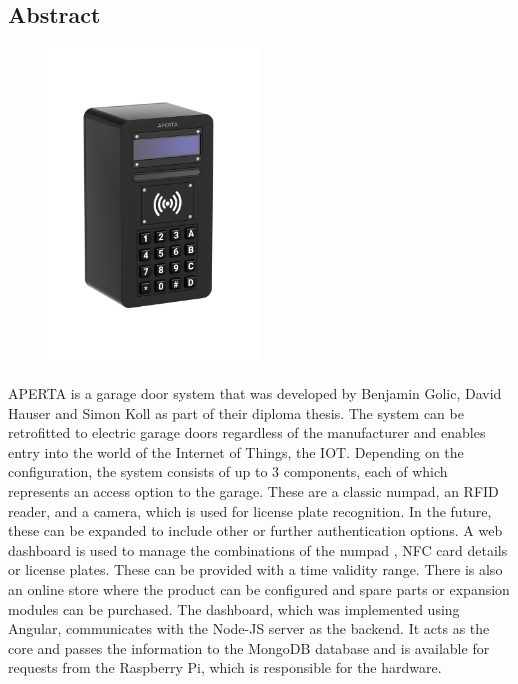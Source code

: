 \begin{spacing}{1}
  \chapter*{Abstract}
\end{spacing}
\begin{figure}
  \begin{center}
    \includegraphics[width=0.5\textwidth]{pics/all-in-package.png}
  \end{center}
\end{figure}
APERTA is a garage door system that was developed by Benjamin Golic, David Hauser and Simon Koll as part of their diploma thesis. The system can be retrofitted to electric garage doors regardless of the manufacturer and enables entry into the world of the Internet of Things, the IOT. Depending on the configuration, the system consists of up to 3 components, each of which represents an access option to the garage. These are a classic numpad, an RFID reader, and a camera, which is used for license plate recognition. In the future, these can be expanded to include other or further authentication options. A web dashboard is used to manage the combinations of the numpad , NFC card details or license plates. These can be provided with a time validity range. There is also an online store where the product can be configured and spare parts or expansion modules can be purchased. The dashboard, which was implemented using Angular, communicates with the Node-JS server as the backend. It acts as the core and passes the information to the MongoDB database and is available for requests from the Raspberry Pi, which is responsible for the hardware.

